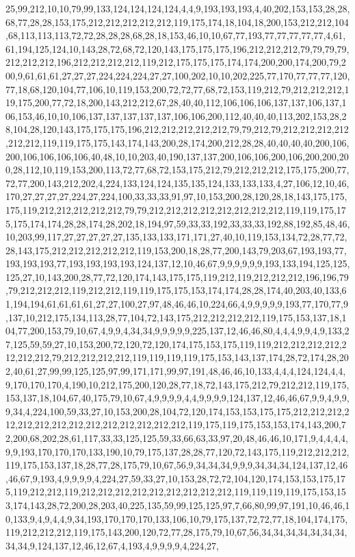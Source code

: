 25,99,212,10,10,79,99,133,124,124,124,124,4,4,9,193,193,193,4,40,202,153,153,28,28,68,77,28,28,153,175,212,212,212,212,212,119,175,174,18,104,18,200,153,212,212,104,68,113,113,113,72,72,28,28,28,68,28,18,153,46,10,10,67,77,193,77,77,77,77,77,4,61,61,194,125,124,10,143,28,72,68,72,120,143,175,175,175,196,212,212,212,79,79,79,79,212,212,212,196,212,212,212,212,119,212,175,175,175,174,174,200,200,174,200,79,200,9,61,61,61,27,27,27,224,224,224,27,27,100,202,10,10,202,225,77,170,77,77,77,120,77,18,68,120,104,77,106,10,119,153,200,72,72,77,68,72,153,119,212,79,212,212,212,119,175,200,77,72,18,200,143,212,212,67,28,40,40,112,106,106,106,137,137,106,137,106,153,46,10,10,106,137,137,137,137,137,106,106,200,112,40,40,40,113,202,153,28,28,104,28,120,143,175,175,175,196,212,212,212,212,212,79,79,212,79,212,212,212,212,212,212,119,119,175,175,143,174,143,200,28,174,200,212,28,28,40,40,40,40,200,106,200,106,106,106,106,40,48,10,10,203,40,190,137,137,200,106,106,200,106,200,200,200,28,112,10,119,153,200,113,72,77,68,72,153,175,212,79,212,212,212,175,175,200,77,72,77,200,143,212,202,4,224,133,124,124,135,135,124,133,133,133,4,27,106,12,10,46,170,27,27,27,27,224,27,224,100,33,33,33,91,97,10,153,200,28,120,28,18,143,175,175,175,119,212,212,212,212,212,79,79,212,212,212,212,212,212,212,212,119,119,175,175,175,174,174,28,28,174,28,202,18,194,97,59,33,33,192,33,33,33,192,88,192,85,48,46,10,203,99,117,27,27,27,27,27,135,133,133,171,171,27,40,10,119,153,134,72,28,77,72,28,143,175,212,212,212,212,212,119,153,200,18,28,77,200,143,79,203,67,193,193,77,193,193,193,77,193,193,193,193,124,137,12,10,46,67,9,9,9,9,9,9,193,133,194,125,125,125,27,10,143,200,28,77,72,120,174,143,175,175,119,212,119,212,212,212,196,196,79,79,212,212,212,119,212,212,119,119,175,175,153,174,174,28,28,174,40,203,40,133,61,194,194,61,61,61,61,27,27,100,27,97,48,46,46,10,224,66,4,9,9,9,9,9,193,77,170,77,9,137,10,212,175,134,113,28,77,104,72,143,175,212,212,212,212,119,175,153,137,18,104,77,200,153,79,10,67,4,9,9,4,34,34,9,9,9,9,9,225,137,12,46,46,80,4,4,4,9,9,4,9,133,27,125,59,59,27,10,153,200,72,120,72,120,174,175,153,175,119,119,212,212,212,212,212,212,212,79,212,212,212,212,119,119,119,119,175,153,143,137,174,28,72,174,28,202,40,61,27,99,99,125,125,97,99,171,171,99,97,191,48,46,46,10,133,4,4,4,124,124,4,4,9,170,170,170,4,190,10,212,175,200,120,28,77,18,72,143,175,212,79,212,212,119,175,153,137,18,104,67,40,175,79,10,67,4,9,9,9,9,4,4,9,9,9,9,124,137,12,46,46,67,9,9,4,9,9,9,34,4,224,100,59,33,27,10,153,200,28,104,72,120,174,153,153,175,175,212,212,212,212,212,212,212,212,212,212,212,212,212,212,119,175,119,175,153,153,174,143,200,72,200,68,202,28,61,117,33,33,125,125,59,33,66,63,33,97,20,48,46,46,10,171,9,4,4,4,4,9,9,193,170,170,170,133,190,10,79,175,137,28,28,77,120,72,143,175,119,212,212,212,119,175,153,137,18,28,77,28,175,79,10,67,56,9,34,34,34,9,9,9,34,34,34,124,137,12,46,46,67,9,193,4,9,9,9,9,4,224,27,59,33,27,10,153,28,72,72,104,120,174,153,153,175,175,119,212,212,119,212,212,212,212,212,212,212,212,212,119,119,119,119,175,153,153,174,143,28,72,200,28,203,40,225,135,59,99,125,125,97,7,66,80,99,97,191,10,46,46,10,133,9,4,9,4,4,9,34,193,170,170,170,133,106,10,79,175,137,72,72,77,18,104,174,175,119,212,212,212,119,175,143,200,120,72,77,28,175,79,10,67,56,34,34,34,34,34,34,34,34,34,9,124,137,12,46,12,67,4,193,4,9,9,9,9,4,224,27,